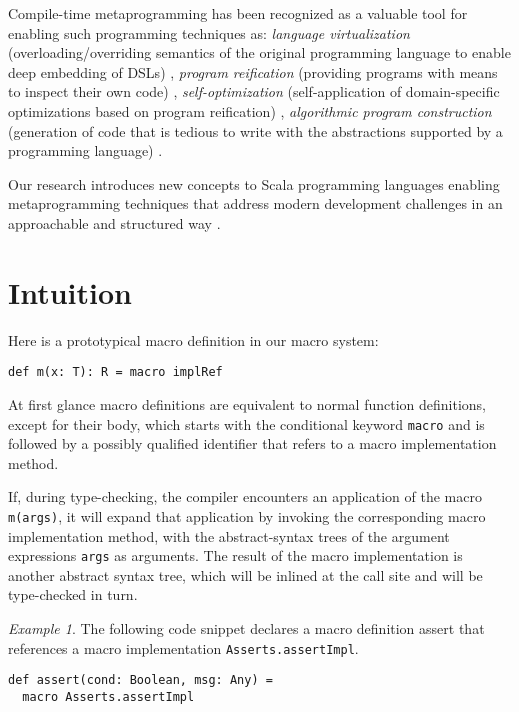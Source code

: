 \documentclass{llncs}
\begin{document}
Compile-time metaprogramming has been recognized as a valuable tool for enabling such programming techniques as: \emph{language virtualization} (overloading/overriding semantics of the original programming language to enable deep embedding of DSLs) \cite{mccool02}, \emph{program reification} (providing programs with means to inspect their own code) \cite{skalski05,attardi01}, \emph{self-optimization} (self-application of domain-specific optimizations based on program reification) \cite{seefried04,cross02}, \emph{algorithmic program construction} (generation of code that is tedious to write with the abstractions supported by a programming language) \cite{sheard02,skalski05}.

Our research introduces new concepts to Scala programming languages enabling metaprogramming techniques that address modern development challenges in an approachable and structured way \cite{kepler12a}.

\section{Intuition}

Here is a prototypical macro definition in our macro system:

\begin{lstlisting}
def m(x: T): R = macro implRef
\end{lstlisting}

At first glance macro definitions are equivalent to normal function definitions, except for their body, which starts with the conditional keyword \lstinline$macro$ and is followed by a possibly qualified identifier that refers to a macro implementation method.

If, during type-checking, the compiler encounters an application of the macro \lstinline$m(args)$, it will expand that application by invoking the corresponding macro implementation method, with the abstract-syntax trees of the argument expressions \lstinline$args$ as arguments. The result of the macro implementation is another abstract syntax tree, which will be inlined at the call site and will be type-checked in turn.

\emph{Example 1}. The following code snippet declares a macro definition assert that references a macro implementation \lstinline$Asserts.assertImpl$.

\begin{lstlisting}
def assert(cond: Boolean, msg: Any) =
  macro Asserts.assertImpl
\end{lstlisting}
\end{document}
